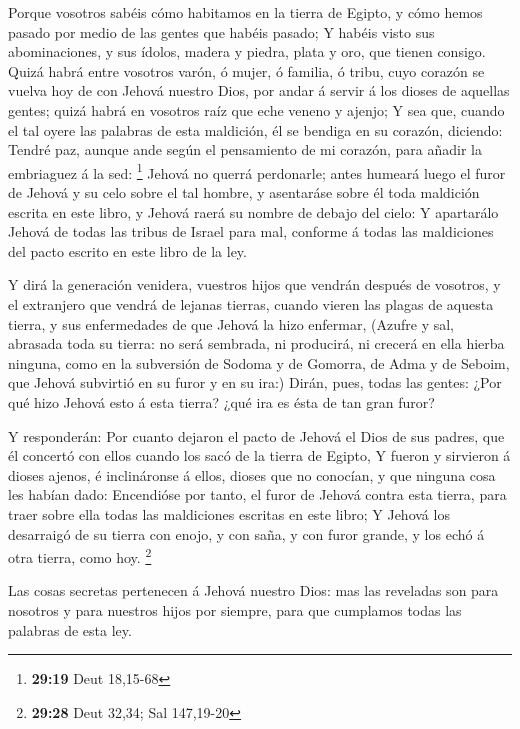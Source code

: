  Porque vosotros sabéis cómo habitamos en la tierra de
Egipto, y cómo hemos pasado por medio de las gentes que habéis pasado;
 Y habéis visto sus abominaciones, y sus ídolos, madera y
piedra, plata y oro, que tienen consigo.  Quizá habrá
entre vosotros varón, ó mujer, ó familia, ó tribu, cuyo corazón se
vuelva hoy de con Jehová nuestro Dios, por andar á servir á los dioses
de aquellas gentes; quizá habrá en vosotros raíz que eche veneno y
ajenjo;  Y sea que, cuando el tal oyere las palabras de
esta maldición, él se bendiga en su corazón, diciendo: Tendré paz,
aunque ande según el pensamiento de mi corazón, para añadir la
embriaguez á la sed: \footnote{\textbf{29:19} Deut 18,15-68}
 Jehová no querrá perdonarle; antes humeará luego el
furor de Jehová y su celo sobre el tal hombre, y asentaráse sobre él
toda maldición escrita en este libro, y Jehová raerá su nombre de debajo
del cielo:  Y apartarálo Jehová de todas las tribus de
Israel para mal, conforme á todas las maldiciones del pacto escrito en
este libro de la ley.

 Y dirá la generación venidera, vuestros hijos que
vendrán después de vosotros, y el extranjero que vendrá de lejanas
tierras, cuando vieren las plagas de aquesta tierra, y sus enfermedades
de que Jehová la hizo enfermar,  (Azufre y sal, abrasada
toda su tierra: no será sembrada, ni producirá, ni crecerá en ella
hierba ninguna, como en la subversión de Sodoma y de Gomorra, de Adma y
de Seboim, que Jehová subvirtió en su furor y en su ira:)
 Dirán, pues, todas las gentes: ¿Por qué hizo Jehová esto
á esta tierra? ¿qué ira es ésta de tan gran furor?

 Y responderán: Por cuanto dejaron el pacto de Jehová el
Dios de sus padres, que él concertó con ellos cuando los sacó de la
tierra de Egipto,  Y fueron y sirvieron á dioses ajenos,
é inclináronse á ellos, dioses que no conocían, y que ninguna cosa les
habían dado:  Encendióse por tanto, el furor de Jehová
contra esta tierra, para traer sobre ella todas las maldiciones escritas
en este libro;  Y Jehová los desarraigó de su tierra con
enojo, y con saña, y con furor grande, y los echó á otra tierra, como
hoy. \footnote{\textbf{29:28} Deut 32,34; Sal 147,19-20}

 Las cosas secretas pertenecen á Jehová nuestro Dios: mas
las reveladas son para nosotros y para nuestros hijos por siempre, para
que cumplamos todas las palabras de esta ley.

